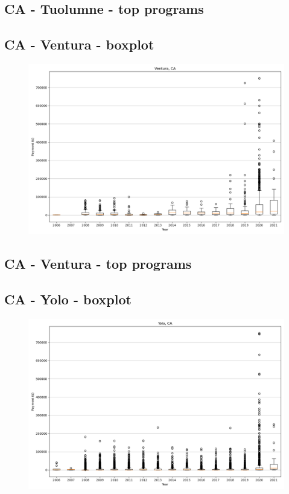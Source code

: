 \subsection*{CA - Tuolumne - top programs}

\newpage
\subsection*{CA - Ventura - boxplot}
\begin{figure}[h]
\centering
\includegraphics[width=7in]{../output/boxplots/counties/Ventura-CA_boxplot.png}
\end{figure}


\subsection*{CA - Ventura - top programs}

\newpage
\subsection*{CA - Yolo - boxplot}
\begin{figure}[h]
\centering
\includegraphics[width=7in]{../output/boxplots/counties/Yolo-CA_boxplot.png}
\end{figure}


